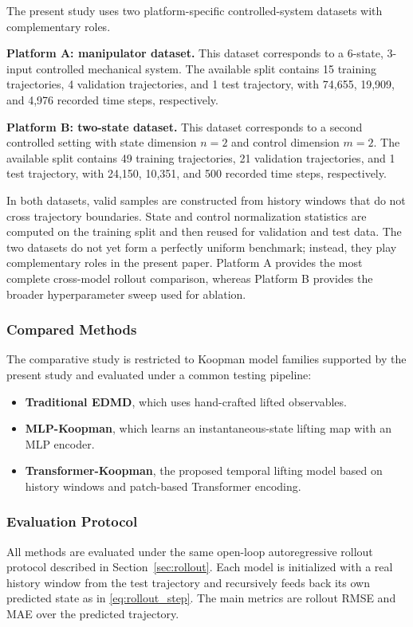 \documentclass[journal]{IEEEtran}
\begin{document}
The present study uses two platform-specific controlled-system datasets with complementary roles.

\textbf{Platform A: manipulator dataset.} This dataset corresponds to a 6-state, 3-input controlled mechanical system. The available split contains 15 training trajectories, 4 validation trajectories, and 1 test trajectory, with 74,655, 19,909, and 4,976 recorded time steps, respectively.

\textbf{Platform B: two-state dataset.} This dataset corresponds to a second controlled setting with state dimension $n=2$ and control dimension $m=2$. The available split contains 49 training trajectories, 21 validation trajectories, and 1 test trajectory, with 24,150, 10,351, and 500 recorded time steps, respectively.

In both datasets, valid samples are constructed from history windows that do not cross trajectory boundaries. State and control normalization statistics are computed on the training split and then reused for validation and test data. The two datasets do not yet form a perfectly uniform benchmark; instead, they play complementary roles in the present paper. Platform A provides the most complete cross-model rollout comparison, whereas Platform B provides the broader hyperparameter sweep used for ablation.

\subsubsection{Compared Methods}

The comparative study is restricted to Koopman model families supported by the present study and evaluated under a common testing pipeline:
\begin{itemize}
    \item \textbf{Traditional EDMD}, which uses hand-crafted lifted observables.
    \item \textbf{MLP-Koopman}, which learns an instantaneous-state lifting map with an MLP encoder.
    \item \textbf{Transformer-Koopman}, the proposed temporal lifting model based on history windows and patch-based Transformer encoding.
\end{itemize}

\subsubsection{Evaluation Protocol}

All methods are evaluated under the same open-loop autoregressive rollout protocol described in Section~\ref{sec:rollout}. Each model is initialized with a real history window from the test trajectory and recursively feeds back its own predicted state as in \eqref{eq:rollout_step}. The main metrics are rollout RMSE and MAE over the predicted trajectory.
\end{document}
